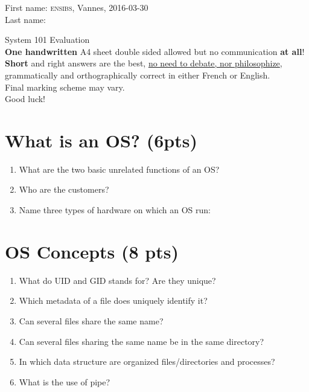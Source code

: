 \documentclass[11pt]{article}
\begin{document}
\noindent First name: \hfill {\scshape ensibs}, Vannes, 2016-03-30 \\
Last name: \\
 
\begin{center}
	{\LARGE{System 101 Evaluation}} \\ \vspace{10pt}
	\textbf{One handwritten} A4 sheet double sided allowed but no communication \textbf{at all}! \\
	\textbf{Short} and right answers are the best, \underline{no need to debate, nor philosophize}, grammatically and orthographically correct in either French or English. \\
	Final marking scheme may vary. \\
	Good luck!
\end{center}

\section{What is an OS? (6pts)}
	\begin{enumerate}
		\item What are the two basic unrelated functions of an OS? %
		\vspace{1cm}
		\item Who are the customers? %
		\vspace{1cm}
		\item Name three types of hardware on which an OS run: %
		\vspace{1cm}
	\end{enumerate}

\section{OS Concepts (8 pts)}
	\begin{enumerate}
		\item What do UID and GID stands for? Are they unique? %
		\vspace{1cm}
		\item Which metadata of a file does uniquely identify it? %
		\vspace{1cm}
		\item Can several files share the same name? %
		\vspace{1cm}
		\item Can several files sharing the same name be in the same directory? %
		\vspace{1cm}
		\item In which data structure are organized files/directories and processes? %
		\vspace{1cm}
		\item What is the use of pipe? %
		\vspace{1cm}
	\end{enumerate}
\end{document}

